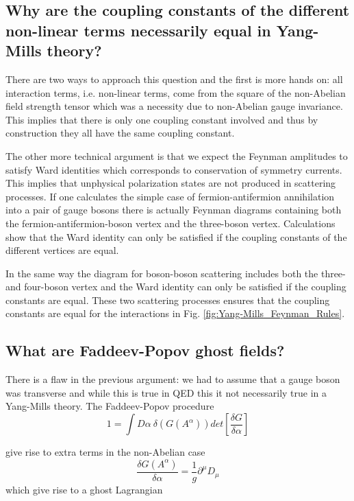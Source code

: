 \documentclass[paper=a4, fontsize=11pt]{scrartcl} %
\numberwithin{equation}{section} %
\numberwithin{figure}{section} %
\numberwithin{table}{section} %
\begin{document}
\subsection{Why are the coupling constants of the different non-linear terms necessarily equal in Yang-Mills theory?}
There are two ways to approach this question and the first is more hands on: all interaction terms, i.e. non-linear terms, come from the square of the non-Abelian field strength tensor which was a necessity due to non-Abelian gauge invariance. This implies that there is only one coupling constant involved and thus by construction they all have the same coupling constant. 

The other more technical argument is that we expect the Feynman amplitudes to satisfy Ward identities which corresponds to conservation of symmetry currents. This implies that unphysical polarization states are not produced in scattering processes. If one calculates the simple case of fermion-antifermion annihilation into a pair of gauge bosons there is actually Feynman diagrams containing both the fermion-antifermion-boson vertex and the three-boson vertex. Calculations show that the Ward identity can only be satisfied if the coupling constants of the different vertices are equal.

In the same way the diagram for boson-boson scattering includes both the three- and four-boson vertex and the Ward identity can only be satisfied if the coupling constants are equal. These two scattering processes ensures that the coupling constants are equal for the interactions in Fig. \ref{fig:Yang-Mills_Feynman_Rules}.

\subsection{What are Faddeev-Popov ghost fields?}
There is a flaw in the previous argument: we had to assume that a gauge boson was transverse and while this is true in QED this it not necessarily true in a Yang-Mills theory. The Faddeev-Popov procedure 
\begin{equation}
1 = \int D\alpha ~ \delta(G(A^{\alpha}))det\left[ \frac{\delta G}{\delta \alpha}\right]
\end{equation}

give rise to extra terms in the non-Abelian case
\begin{equation}
\frac{\delta G(A^{\alpha})}{\delta \alpha} = \dfrac{1}{g} \partial^{\mu} D_{\mu} 
\end{equation}
which give rise to a ghost Lagrangian
\end{document}

